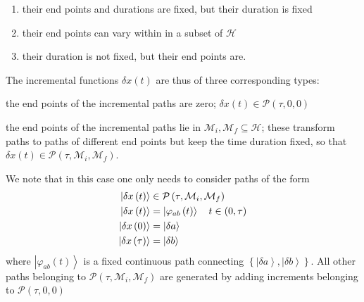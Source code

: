 \documentclass[aps,preprint]{revtex4}
\begin{document}
\begin{enumerate}
\item their end points and durations are fixed, but their duration is fixed

\item their end points can vary within in a subset of $\mathcal{H}$

\item their duration is not fixed, but their end points are.
\end{enumerate}

The incremental functions $\delta x\left( t\right) $ are thus of three
corresponding types:

\begin{description}
\item[$\bullet $] the end points of the incremental paths are zero; $\delta
x\left( t\right) \in \mathcal{P}\left( \tau ,0,0\right) $

\item[$\bullet $] the end points of the incremental paths lie in $\mathcal{M}%
_{i},\mathcal{M}_{f}\subseteq \mathcal{H}$; these transform paths to paths
of different end points but keep the time duration fixed, so that $\delta
x\left( t\right) \in \mathcal{P}\left( \tau ,\mathcal{M}_{i},\mathcal{M}%
_{f}\right) $.

\item We note that in this case one only needs to consider paths of the form
\begin{align}
\left\vert \delta x\left( t\right) \right\rangle & \in \mathcal{P}\left(
\tau ,\mathcal{M}_{i},\mathcal{M}_{f}\right)  \notag \\
\left\vert \delta x\left( t\right) \right\rangle & =\left\vert \varphi
_{ab}\left( t\right) \right\rangle \quad t\in \left( 0,\tau \right)  \notag
\\
\left\vert \delta x\left( 0\right) \right\rangle & =\left\vert \delta
a\right\rangle  \notag \\
\left\vert \delta x\left( \tau \right) \right\rangle & =\left\vert \delta
b\right\rangle
\end{align}%
where $\left\vert \varphi _{ab}\left( t\right) \right\rangle $ is a fixed
continuous path connecting $\left\{ \left\vert \delta a\right\rangle
,\left\vert \delta b\right\rangle \right\} $. All other paths belonging to $%
\mathcal{P}\left( \tau ,\mathcal{M}_{i},\mathcal{M}_{f}\right) $ are
generated by adding increments belonging to $\mathcal{P}\left( \tau
,0,0\right) $


\end{description}
\end{document}
